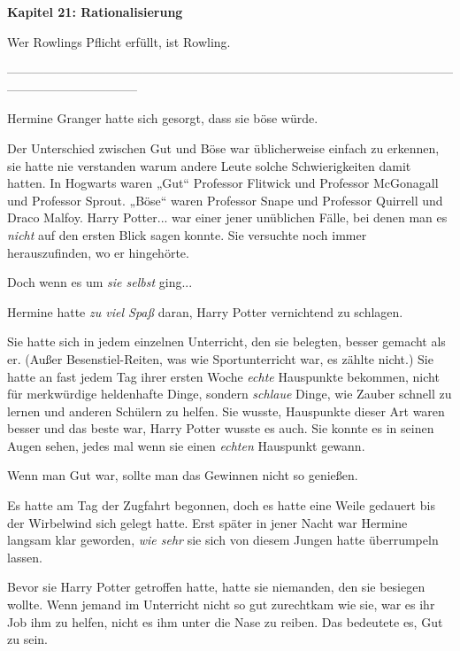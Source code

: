 

\hypertarget{rationalisierung}{%

\textbf{Kapitel 21: Rationalisierung\\ }

\hfill\break Wer Rowlings Pflicht erfüllt, ist Rowling.

--------------------------------------------------------------------------------------------------------------------------------------------

\hfill\break Hermine Granger hatte sich gesorgt, dass sie böse würde.

Der Unterschied zwischen Gut und Böse war üblicherweise einfach zu erkennen, sie hatte nie verstanden warum andere Leute solche Schwierigkeiten damit hatten. In Hogwarts waren „Gut“ Professor Flitwick und Professor McGonagall und Professor Sprout. „Böse“ waren Professor Snape und Professor Quirrell und Draco Malfoy. Harry Potter... war einer jener unüblichen Fälle, bei denen man es \emph{nicht} auf den ersten Blick sagen konnte. Sie versuchte noch immer herauszufinden, wo er hingehörte.

Doch wenn es um \emph{sie selbst} ging...

Hermine hatte \emph{zu viel Spaß} daran, Harry Potter vernichtend zu schlagen.

Sie hatte sich in jedem einzelnen Unterricht, den sie belegten, besser gemacht als er. (Außer Besenstiel-Reiten, was wie Sportunterricht war, es zählte nicht.) Sie hatte an fast jedem Tag ihrer ersten Woche \emph{echte} Hauspunkte bekommen, nicht für merkwürdige heldenhafte Dinge, sondern \emph{schlaue} Dinge, wie Zauber schnell zu lernen und anderen Schülern zu helfen. Sie wusste, Hauspunkte dieser Art waren besser und das beste war, Harry Potter wusste es auch. Sie konnte es in seinen Augen sehen, jedes mal wenn sie einen \emph{echten} Hauspunkt gewann.

Wenn man Gut war, sollte man das Gewinnen nicht so genießen.

Es hatte am Tag der Zugfahrt begonnen, doch es hatte eine Weile gedauert bis der Wirbelwind sich gelegt hatte. Erst später in jener Nacht war Hermine langsam klar geworden, \emph{wie sehr} sie sich von diesem Jungen hatte überrumpeln lassen.

Bevor sie Harry Potter getroffen hatte, hatte sie niemanden, den sie besiegen wollte. Wenn jemand im Unterricht nicht so gut zurechtkam wie sie, war es ihr Job ihm zu helfen, nicht es ihm unter die Nase zu reiben. Das bedeutete es, Gut zu sein.

}
